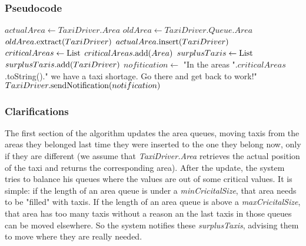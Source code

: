 		\subsubsection{Pseudocode}
		\begin{algorithm}
			\begin{algorithmic}[1]
					\State $actualArea \gets TaxiDriver.Area$
					\State $oldArea \gets TaxiDriver.Queue.Area$
						\State $oldArea.\textnormal{extract}(TaxiDriver)$
						\State $actualArea.\textnormal{insert}(TaxiDriver)$
					\EndIf
				\EndFor
				\State $criticalAreas \gets \textnormal{List}$
						\State $criticalAreas.\textnormal{add}(Area)$
					\EndIf
				\EndFor
				\State $surplusTaxis \gets \textnormal{List}$
						\State $surplusTaxis.\textnormal{add}(TaxiDriver)$
					\EndFor
				\EndFor
				\State $nofitication \gets$ "In the areas ".$criticalAreas$.toString()." we have a taxi shortage.
					Go there and get back to work!"
					\State $TaxiDriver.\textnormal{sendNotification}(notification)$
				\EndFor
			\end{algorithmic}
		\end{algorithm}
		\subsubsection{Clarifications}
		The first section of the algorithm updates the area queues, moving taxis from the areas they belonged last
		time they were inserted to the one they belong now, only if they are different (we assume that
		\textit{TaxiDriver.Area} retrieves the actual position of the taxi and returns the corresponding area).
		After the update, the system tries to balance his queues where the values are out of some critical values.
		It is simple: if the length of an area queue is under a \textit{minCricitalSize}, that area needs to be
		"filled" with taxis. If the length of an area queue is above a \textit{maxCricitalSize}, that area has
		too many taxis without a reason an the last taxis in those queues can be moved elsewhere.
		So the system notifies these \textit{surplusTaxis}, advising them to move where they are really needed.